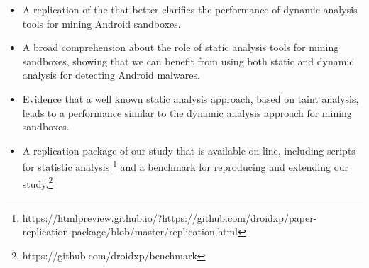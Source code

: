\begin{itemize}
\item A replication of the \blls that better clarifies the performance of
  dynamic analysis tools for mining Android sandboxes.

\item A broad comprehension about the role of static analysis tools for mining
  sandboxes, showing that we can benefit from using both static and dynamic
  analysis for detecting Android malwares.

\item Evidence that a well known static analysis approach, based on
  taint analysis, leads to a performance similar to the dynamic analysis
  approach for mining sandboxes.

\item A replication package of our study that is available on-line, including
  scripts for statistic analysis \footnote{https://htmlpreview.github.io/?https://github.com/droidxp/paper-replication-package/blob/master/replication.html}
  and a benchmark for reproducing and extending our study.\footnote{https://github.com/droidxp/benchmark} 
\end{itemize}




 
 
 
